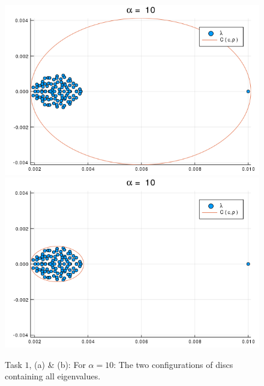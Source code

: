 \begin{figure}[h!]
\centering
\includegraphics[scale=0.4]{../task2/images/Task2_b_a10_1.png}
\includegraphics[scale=0.4]{../task2/images/Task2_b_a10_2.png}
\caption{Task $1$, (a) \& (b): For $\alpha = 10$: The two configurations of discs containing all eigenvalues.}
\label{fig:task2b_10}
\end{figure}

